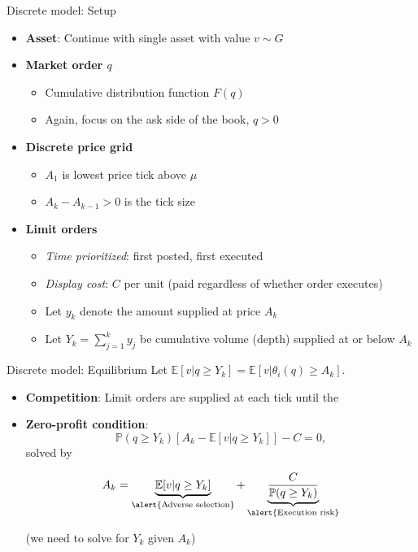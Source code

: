 \documentclass[english,10pt
,aspectratio=169
]{beamer}
\begin{document}
\begin{frame}{Discrete model: Setup}
	\begin{itemize}
		\item \textbf{Asset}: Continue with single asset with value $v \sim G$
		\item \textbf{Market order $q$}
		\begin{itemize}
			\item Cumulative distribution function $F(q)$
			\item Again, focus on the ask side of the book, $q>0$
		\end{itemize}
		\item \textbf{Discrete price grid}
		\begin{itemize}
			\item $A_1$ is lowest price tick above $\mu$
			\item $A_k-A_{k-1}>0$ is the tick size
		\end{itemize}
		\item \textbf{Limit orders}
		\begin{itemize}
			\item \textit{Time prioritized}: first posted, first executed
			\item \textit{Display cost}: $C$ per unit (paid regardless of whether order executes)
			\item Let $y_k$ denote the amount supplied at price $A_k$
			\item Let $Y_k=\sum_{j=1}^k y_j$ be cumulative volume (depth) supplied at or below $A_k$
		\end{itemize}
	\end{itemize}
\end{frame}


\begin{frame}{Discrete model: Equilibrium}
	Let $\mathbb{E}[v|q \geq Y_k]=\mathbb{E}[v|\theta_i(q) \geq A_k]$.
	\begin{itemize}
		\item \textbf{Competition}: Limit orders are supplied at each tick until the 
		\item \textbf{Zero-profit condition}:
		\[
		\mathbb{P}(q \geq Y_k)[A_k-\mathbb{E}[v|q \geq Y_k]] - C = 0,
		\]
		solved by
		\begin{block}{}
			\[
			A_k = \underbrace{\mathbb{E}[v| q \geq Y_k]}_{\text{\alert{Adverse selection}}} + \underbrace{\frac{C}{\mathbb{P}(q\geq Y_k)}}_{\text{\alert{Execution risk}}}
			\]
		\end{block}
		(we need to solve for $Y_k$ given $A_k$)
	\end{itemize}
\end{frame}
\end{document}
